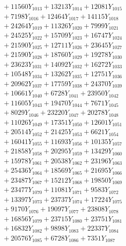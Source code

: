 \documentclass[a4paper,10pt]{article}
\begin{document}
{\begin{align}
&\;  + 11560 Y_{1013} + 13213 Y_{1014} + 12081 Y_{1015} \\[0.3ex]
&\;  + 7198 Y_{1016} + 12464 Y_{1017} + 14115 Y_{1018} \\[0.5ex]\allowbreak
&\;  + 24264 Y_{1019} + 11326 Y_{1020} + 7999 Y_{1021} \\[0.3ex]
&\;  + 24525 Y_{1022} + 15709 Y_{1023} + 16747 Y_{1024} \\[0.3ex]
&\;  + 21590 Y_{1025} + 12711 Y_{1026} + 23645 Y_{1027} \\[0.3ex]
&\;  + 21590 Y_{1028} + 18760 Y_{1029} + 19278 Y_{1030} \\[0.3ex]
&\;  + 23623 Y_{1031} + 14092 Y_{1032} + 16272 Y_{1033} \\[0.3ex]
&\;  + 10548 Y_{1034} + 13262 Y_{1035} + 12751 Y_{1036} \\[0.3ex]
&\;  + 20962 Y_{1037} + 17759 Y_{1038} + 24370 Y_{1039} \\[0.3ex]
&\;  + 10661 Y_{1040} + 6728 Y_{1041} + 23950 Y_{1042} \\[0.3ex]
&\;  + 11605 Y_{1043} + 19470 Y_{1044} + 7671 Y_{1045} \\[0.3ex]
&\;  + 8029 Y_{1046} + 23220 Y_{1047} + 20278 Y_{1048} \\[0.5ex]\allowbreak
&\;  + 11026 Y_{1049} + 17351 Y_{1050} + 12601 Y_{1051} \\[0.3ex]
&\;  + 20514 Y_{1052} + 21425 Y_{1053} + 6621 Y_{1054} \\[0.3ex]
&\;  + 16041 Y_{1055} + 11693 Y_{1056} + 10135 Y_{1057} \\[0.3ex]
&\;  + 21858 Y_{1058} + 20295 Y_{1059} + 13429 Y_{1060} \\[0.3ex]
&\;  + 15978 Y_{1061} + 20538 Y_{1062} + 23196 Y_{1063} \\[0.3ex]
&\;  + 25436 Y_{1064} + 18569 Y_{1065} + 21695 Y_{1066} \\[0.3ex]
&\;  + 23487 Y_{1067} + 15212 Y_{1068} + 19850 Y_{1069} \\[0.3ex]
&\;  + 23477 Y_{1070} + 11081 Y_{1071} + 9583 Y_{1072} \\[0.3ex]
&\;  + 13397 Y_{1073} + 23737 Y_{1074} + 17224 Y_{1075} \\[0.3ex]
&\;  + 9170 Y_{1076} + 19097 Y_{1077} + 23808 Y_{1078} \\[0.5ex]\allowbreak
&\;  + 16856 Y_{1079} + 23715 Y_{1080} + 23751 Y_{1081} \\[0.3ex]
&\;  + 16832 Y_{1082} + 9898 Y_{1083} + 22337 Y_{1084} \\[0.3ex]
&\;  + 20576 Y_{1085} + 6728 Y_{1086} + 7351 Y_{1087} \\[0.3ex]

\end{align}}
\end{document}

